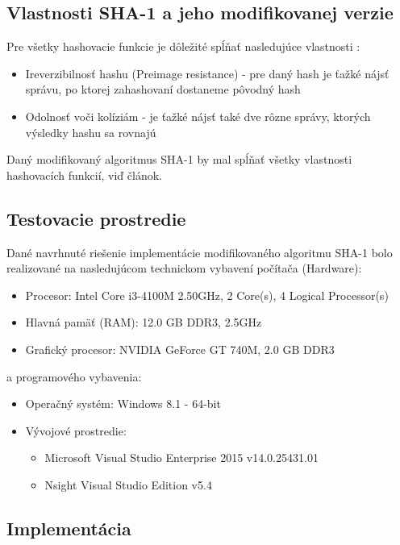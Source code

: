\documentclass[conference]{IEEEtran}
\begin{document}
\subsection{Vlastnosti SHA-1 a jeho modifikovanej verzie}

Pre všetky hashovacie funkcie je dôležité spĺňať nasledujúce vlastnosti \cite{CHF}:

\begin{itemize}
	\item{Ireverzibilnosť hashu (Preimage resistance) - pre daný hash je ťažké nájsť správu, po ktorej zahashovaní dostaneme pôvodný hash}
	\item{Odolnosť voči kolíziám - je ťažké nájsť také dve rôzne správy, ktorých výsledky hashu sa rovnajú}
\end{itemize}

Daný modifikovaný algoritmus SHA-1 by mal spĺňať všetky vlastnosti hashovacích funkcií, viď článok\cite{MSHA}.

\subsection{Testovacie prostredie}

Dané navrhnuté riešenie implementácie modifikovaného algoritmu SHA-1 bolo realizované na nasledujúcom technickom vybavení počítača (Hardware):

\begin{itemize}
	\item{Procesor: Intel Core i3-4100M 2.50GHz, 2 Core(s), 4 Logical Processor(s)}
	\item{Hlavná pamäť (RAM): 12.0 GB DDR3, 2.5GHz}
	\item{Grafický procesor: NVIDIA GeForce GT 740M, 2.0 GB DDR3}
\end{itemize}

a programového vybavenia:

\begin{itemize}
	\item{Operačný systém: Windows 8.1 - 64-bit}
	\item{Vývojové prostredie:}
	\begin{itemize}
		\item{Microsoft Visual Studio Enterprise 2015 v14.0.25431.01}
		\item{Nsight Visual Studio Edition v5.4}
	\end{itemize}
\end{itemize}

\subsection{Implementácia}
\end{document}
